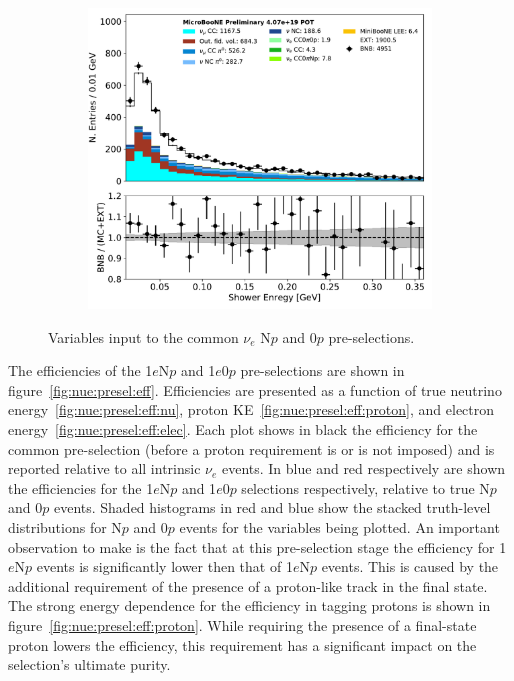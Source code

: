 \documentclass[a4paper]{article}
\begin{document}
\begin{figure}[H]
\begin{center}
\begin{subfigure}[b]{0.3\textwidth}
    \caption{\label{fig:nue:presel:ntrack} }
    \end{subfigure}
    \begin{subfigure}[b]{0.3\textwidth}
    \centering
    \includegraphics[width=1.00\textwidth]{nueselection/shr_energy_tot_cali_01132020_RUN1.pdf}
    \caption{\label{fig:nue:presel:shrenergy} }
    \end{subfigure}
\caption{\label{fig:nue:presel}Variables input to the common $\nu_e$ N$p$ and 0$p$ pre-selections.}
\end{center}
\end{figure}

\par The efficiencies of the 1$e$N$p$ and 1$e$0$p$ pre-selections are shown in figure~\ref{fig:nue:presel:eff}. Efficiencies are presented as a function of true neutrino energy~\ref{fig:nue:presel:eff:nu}, proton KE~\ref{fig:nue:presel:eff:proton}, and electron energy~\ref{fig:nue:presel:eff:elec}. Each plot shows in black the efficiency for the common pre-selection (before a proton requirement is or is not imposed) and is reported relative to all intrinsic $\nu_e$ events. In blue and red respectively are shown the efficiencies for the  1$e$N$p$ and 1$e$0$p$ selections respectively, relative to true N$p$ and 0$p$ events. Shaded histograms in red and blue show the stacked truth-level distributions for N$p$ and 0$p$ events for the variables being plotted. An important observation to make is the fact that at this pre-selection stage the efficiency for 1$e$N$p$ events is significantly lower then that of 1$e$N$p$ events. This is caused by the additional requirement of the presence of a proton-like track in the final state. The strong energy dependence for the efficiency in tagging protons is shown in figure~\ref{fig:nue:presel:eff:proton}. While requiring the presence of a final-state proton lowers the efficiency, this requirement has a significant impact on the selection's ultimate purity.
\end{document}
